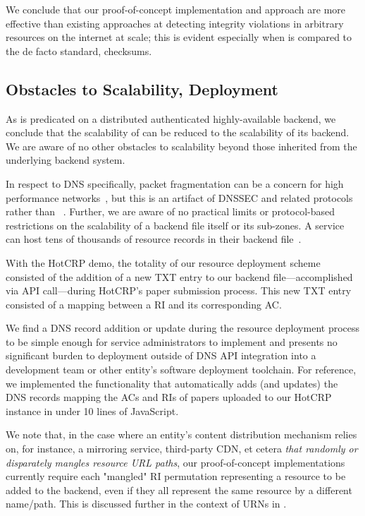 We conclude that our proof-of-concept \SYSTEM{} implementation and approach are
more effective than existing approaches at detecting integrity violations in
arbitrary resources on the internet at scale; this is evident especially when
\SYSTEM{} is compared to the de facto standard, checksums.

\subsection{Obstacles to Scalability, Deployment}

As \SYSTEM{} is predicated on a distributed authenticated highly-available
backend, we conclude that the scalability of \SYSTEM{} can be reduced to the
scalability of its backend. We are aware of no other obstacles to scalability
beyond those inherited from the underlying backend system.

In respect to DNS specifically, packet fragmentation can be a concern for high
performance networks~\cite{EDNS}, but this is an artifact of DNSSEC and related
protocols rather than \SYSTEM{}~\cite{DNSSEC}. Further, we are aware of no
practical limits or protocol-based restrictions on the scalability of a backend
file itself or its sub-zones. A service can host tens of thousands of resource
records in their backend file~\cite{DNS1, DNS2}.

With the HotCRP demo, the totality of our resource deployment scheme consisted
of the addition of a new TXT entry to our backend file---accomplished via API
call---during HotCRP's paper submission process. This new TXT entry consisted of
a mapping between a RI and its corresponding AC.

We find a DNS record addition or update during the resource deployment process
to be simple enough for service administrators to implement and presents no
significant burden to deployment outside of DNS API integration into a
development team or other entity's software deployment toolchain. For reference,
we implemented the functionality that automatically adds (and updates) the DNS
records mapping the ACs and RIs of papers uploaded to our HotCRP instance in
under 10 lines of JavaScript.

We note that, in the case where an entity's content distribution mechanism
relies on, for instance, a mirroring service, third-party CDN, et cetera
\emph{that randomly or disparately mangles resource URL paths}, our
proof-of-concept implementations currently require each "mangled" RI permutation
representing a resource to be added to the backend, even if they all represent
the same resource by a different name/path. This is discussed further in the
context of URNs in .

